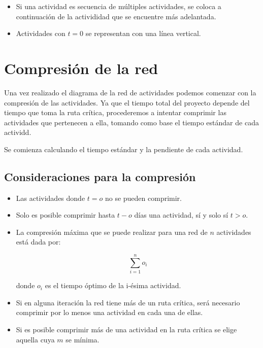 	\begin{itemize}
		\item Si una actividad es secuencia de múltiples actividades, se coloca a continuación de la activididad que se encuentre más adelantada.
		
		\item Actividades con $t=0$ se representan con una línea vertical.
	\end{itemize}
	
	\section{Compresión de la red}
	
	Una vez realizado el diagrama de la red de actividades podemos comenzar con la compresión de las actividades. Ya que el tiempo total del proyecto depende del tiempo que toma la ruta crítica, procederemos a intentar comprimir las actividades que pertenecen a ella, tomando como base el tiempo estándar de cada actividd.
	
	Se comienza calculando el tiempo estándar y la pendiente de cada actividad.
	
	\subsection{Consideraciones para la compresión}
	\begin{itemize}
		
		\item Las actividades donde $t=o$ no se pueden comprimir.
		
		\item Solo es posible comprimir hasta $t-o$ días una actividad, sí y solo sí $t>o$.
		
		\item La compresión máxima que se puede realizar para una red de $n$ actividades está dada por:
		
		\[\sum_{i=1}^{n} o_{i}\]
		
		donde $o_i$ es el tiempo óptimo de la i-ésima actividad.
		
		\item Si en alguna iteración la red tiene más de un ruta crítica, será necesario comprimir por lo menos una actividad en cada una de ellas.
		
		\item Si es posible comprimir más de una actividad en la ruta crítica se elige aquella cuya $m$ se mínima.
	\end{itemize}